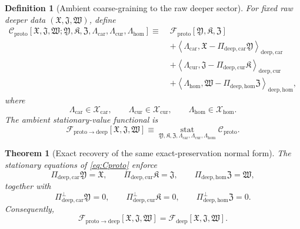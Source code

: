 \documentclass[11pt]{article}
\newcommand{\DeepFunctional}{\mathscr F_{\mathrm{deep}}}
\newcommand{\ProtoFunctional}{\mathscr F_{\mathrm{proto}}}
\newcommand{\ProtoToDeep}{\mathscr F_{\mathrm{proto}\to\mathrm{deep}}}
\newcommand{\DeepTensorClass}{\mathscr X_{\mathrm{car}}}
\newcommand{\DeepRelabelClass}{\mathscr X_{\mathrm{cur}}}
\newcommand{\DeepFreeClass}{\mathscr X_{\mathrm{hom}}}
\newcommand{\DeepTensor}{\mathfrak X}
\newcommand{\DeepRelabel}{\mathfrak J}
\newcommand{\DeepFree}{\mathfrak W}
\newcommand{\ProtoTensor}{\mathfrak Y}
\newcommand{\ProtoRelabel}{\mathfrak K}
\newcommand{\ProtoFree}{\mathfrak Z}
\newcommand{\ProtoCarProj}{\Pi_{\mathrm{deep,car}}}
\newcommand{\ProtoCurProj}{\Pi_{\mathrm{deep,cur}}}
\newcommand{\ProtoHomProj}{\Pi_{\mathrm{deep,hom}}}
\newcommand{\ProtoCarPerp}{\Pi_{\mathrm{deep,car}}^{\perp}}
\newcommand{\ProtoCurPerp}{\Pi_{\mathrm{deep,cur}}^{\perp}}
\newcommand{\ProtoHomPerp}{\Pi_{\mathrm{deep,hom}}^{\perp}}
\newtheorem{definition}{Definition}
\newtheorem{theorem}{Theorem}
\begin{document}
\begin{definition}[Ambient coarse-graining to the raw deeper sector]
\label{def:Cproto}
For fixed raw deeper data \((\DeepTensor,\DeepRelabel,\DeepFree)\), define
\begin{equation}
\begin{aligned}
\mathscr C_{\mathrm{proto}}
[\DeepTensor,\DeepRelabel,\DeepFree;
\ProtoTensor,\ProtoRelabel,\ProtoFree,
\Lambda_{\mathrm{car}},\Lambda_{\mathrm{cur}},\Lambda_{\mathrm{hom}}]
\equiv\;
&\ProtoFunctional[\ProtoTensor,\ProtoRelabel,\ProtoFree]
\\
&+\left\langle
\Lambda_{\mathrm{car}},
\DeepTensor-\ProtoCarProj\ProtoTensor
\right\rangle_{\mathrm{deep,car}}
\\
&+\left\langle
\Lambda_{\mathrm{cur}},
\DeepRelabel-\ProtoCurProj\ProtoRelabel
\right\rangle_{\mathrm{deep,cur}}
\\
&+\left\langle
\Lambda_{\mathrm{hom}},
\DeepFree-\ProtoHomProj\ProtoFree
\right\rangle_{\mathrm{deep,hom}},
\end{aligned}
\label{eq:Cproto}
\end{equation}
where
\[
\Lambda_{\mathrm{car}}\in\DeepTensorClass,\qquad
\Lambda_{\mathrm{cur}}\in\DeepRelabelClass,\qquad
\Lambda_{\mathrm{hom}}\in\DeepFreeClass.
\]
The ambient stationary-value functional is
\begin{equation}
\ProtoToDeep[\DeepTensor,\DeepRelabel,\DeepFree]
\equiv
\operatorname*{stat}_{\ProtoTensor,\ProtoRelabel,\ProtoFree,\Lambda_{\mathrm{car}},\Lambda_{\mathrm{cur}},\Lambda_{\mathrm{hom}}}
\mathscr C_{\mathrm{proto}}.
\label{eq:Fprotostat}
\end{equation}
\end{definition}

\begin{theorem}[Exact recovery of the same exact-preservation normal form]
\label{thm:recoverdeep}
The stationary equations of \eqref{eq:Cproto} enforce
\begin{equation}
\ProtoCarProj\ProtoTensor=\DeepTensor,
\qquad
\ProtoCurProj\ProtoRelabel=\DeepRelabel,
\qquad
\ProtoHomProj\ProtoFree=\DeepFree,
\label{eq:proto_constraints_1}
\end{equation}
together with
\begin{equation}
\ProtoCarPerp\ProtoTensor=0,
\qquad
\ProtoCurPerp\ProtoRelabel=0,
\qquad
\ProtoHomPerp\ProtoFree=0.
\label{eq:proto_constraints_2}
\end{equation}
Consequently,
\begin{equation}
\ProtoToDeep[\DeepTensor,\DeepRelabel,\DeepFree]
=
\DeepFunctional[\DeepTensor,\DeepRelabel,\DeepFree].
\label{eq:proto_to_deep}
\end{equation}
\end{theorem}
\end{document}
